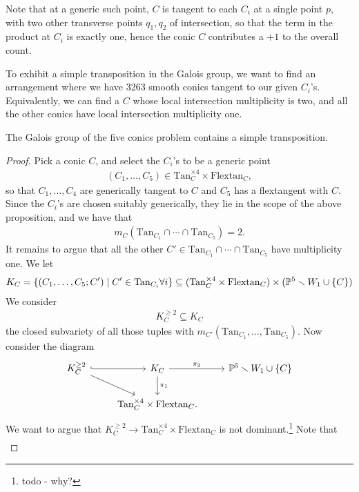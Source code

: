 \documentclass[11pt]{amsart}
\providecommand{\Flextan}{\mathrm{Flextan}}
\providecommand{\Tan}{\mathrm{Tan}}
\begin{document}
Note that at a generic such point, $C$ is tangent to each $C_i$ at a single point $p$, with two other transverse points $q_1, q_2$ of intersection, so that the term in the product at $C_i$ is exactly one, hence the conic $C$ contributes a $+1$ to the overall count.

To exhibit a simple transposition in the Galois group, we want to find an arrangement where we have 3263 smooth conics tangent to our given $C_i$'s. Equivalently, we can find a $C$ whose local intersection multiplicity is two, and all the other conics have local intersection multiplicity one.

\begin{lemma} The Galois group of the five conics problem contains a simple transposition.
\end{lemma}
\begin{proof} Pick a conic $C$, and select the $C_i$'s to be a generic point
\begin{align*}
    (C_1, \ldots, C_5) \in \Tan_C^{\times 4} \times \Flextan_C,
\end{align*}
so that $C_1, \ldots, C_4$ are generically tangent to $C$ and $C_5$ has a flextangent with $C$. Since the $C_i$'s are chosen suitably generically, they lie in the scope of the above proposition, and we have that
\begin{align*}
    m_C(\Tan_{C_1} \cap \cdots \cap \Tan_{C_5}) = 2.
\end{align*}
It remains to argue that all the other $C' \in \Tan_{C_1} \cap \cdots \cap \Tan_{C_5}$ have multiplicity one. We let
\begin{align*}
    K_C = \left\{ (C_1, \ldots, C_5; C') \mid C' \in \Tan_{C_i}\forall i \right\} \subseteq (\Tan_C^{\times 4} \times \Flextan_C) \times (\P^5 \minus W_1 \cup \{C\})
\end{align*}
We consider
\begin{align*}
    K_C^{\ge 2} \subseteq K_C
\end{align*}
the closed subvariety of all those tuples with $m_{C'}(\Tan_{C_1}, \ldots, \Tan_{C_5})$. Now consider the diagram
\[ \begin{tikzcd}
    K_C^{\ge2}\rar[hook]\ar[dr] & K_C\dar["\pi_1"]\rar["\pi_2"] & \P^5\minus W_1 \cup \{C\}\\
     & \Tan_C^{\times 4}\times\Flextan_C.
\end{tikzcd} \]
We want to argue that $K_C^{\ge 2} \to \Tan_C^{\times 4}\times\Flextan_C$ is not dominant.\footnote{todo - why?} Note that
\begin{align*}

\end{align*}
\end{proof}
\end{document}
